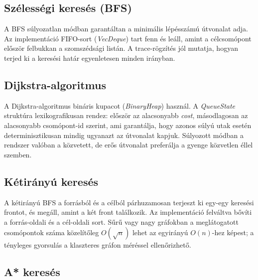 
\subsection{Szélességi keresés (BFS)}

A BFS súlyozatlan módban garantáltan a minimális lépésszámú útvonalat adja. Az implementáció FIFO-sort (\textit{VecDeque}) tart fenn és leáll, amint a célcsomópont először felbukkan a szomszédsági listán. A trace-rögzítés jól mutatja, hogyan terjed ki a keresési határ egyenletesen minden irányban.


\subsection{Dijkstra-algoritmus}

A Dijkstra-algoritmus \cite{dijkstra1959} bináris kupacot (\textit{BinaryHeap}) használ. A \textit{QueueState} struktúra lexikografikusan rendez: először az alacsonyabb \textit{cost}, másodlagosan az alacsonyabb csomópont-id szerint, ami garantálja, hogy azonos súlyú utak esetén determinisztikusan mindig ugyanazt az útvonalat kapjuk. Súlyozott módban a rendszer valóban a közvetett, de erős útvonalat preferálja a gyenge közvetlen éllel szemben.

\subsection{Kétirányú keresés}

A kétirányú BFS a forrásból és a célból párhuzamosan terjeszt ki egy-egy keresési frontot, és megáll, amint a két front találkozik. Az implementáció felváltva bővíti a forrás-oldali és a cél-oldali sort. Sűrű vagy nagy gráfokban a meglátogatott csomópontok száma közelítőleg $O(\sqrt{n})$ lehet az egyirányú $O(n)$-hez képest; a tényleges gyorsulás a klaszteres gráfon méréssel ellenőrizhető.

\subsection{A* keresés}

